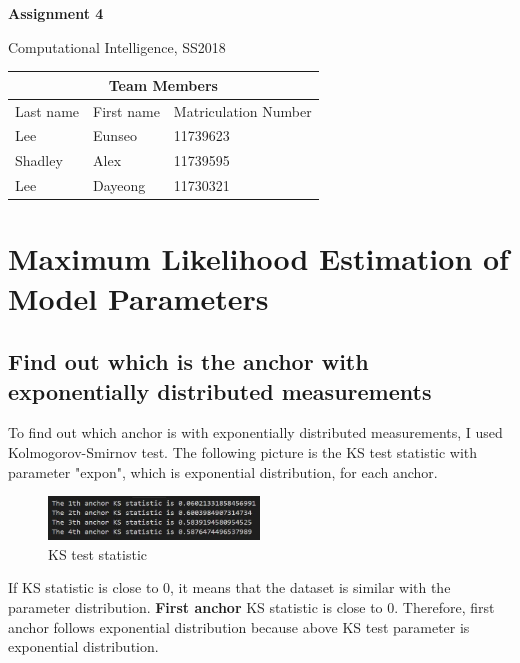 \documentclass[a4paper]{article}
\begin{document}
	\begin{titlepage}
		\centering
		{\huge \bf Assignment 4\par}
		\vspace{1cm}
		{\Large Computational Intelligence, SS2018\par}
		\vspace{1cm}
		\begin{tabular}{|l|l|l|}
			\hline
			\multicolumn{3}{|c|}{\textbf{Team Members}}   \\ \hline
			Last name & First name & Matriculation Number \\ \hline
			Lee       & Eunseo     & 11739623             \\ \hline
			Shadley   & Alex       & 11739595             \\ \hline
			Lee       & Dayeong    & 11730321             \\ \hline
		\end{tabular}
	\end{titlepage}

\section{Maximum Likelihood Estimation of Model Parameters}
\subsection{Find out which is the anchor with exponentially distributed measurements}

To find out which anchor is with exponentially distributed measurements, I used Kolmogorov-Smirnov test.\newline
The following picture is the KS test statistic with parameter "expon", which is exponential distribution, for each anchor.

\begin{figure}[h]
	\begin{center}
	\includegraphics[width=0.5\textwidth]{kstest.jpg}
	\caption{KS test statistic}
	\end{center}
\end{figure}

If KS statistic is close to 0, it means that the dataset is similar with the parameter distribution. \textbf{First anchor} KS statistic is close to 0. Therefore, first anchor follows exponential distribution because above KS test parameter is exponential distribution.
\end{document}
